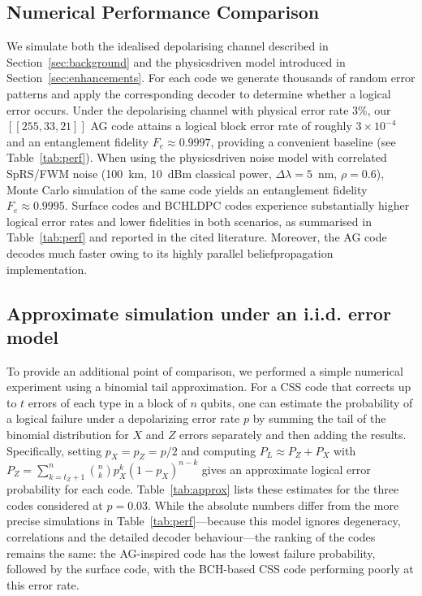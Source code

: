 \documentclass[conference]{IEEEtran}  %
\begin{document}
\subsection{Numerical Performance Comparison}\label{sec:comparison}
We simulate both the idealised depolarising channel described in Section~\ref{sec:background} and the physics\textendash driven model introduced in Section~\ref{sec:enhancements}.  For each code we generate thousands of random error patterns and apply the corresponding decoder to determine whether a logical error occurs.  Under the depolarising channel with physical error rate 3\%, our $[[255,33,21]]$ AG code attains a logical block error rate of roughly $3\times 10^{-4}$ and an entanglement fidelity $F_e\approx 0.9997$, providing a convenient baseline (see Table~\ref{tab:perf}).  When using the physics\textendash driven noise model with correlated SpRS/FWM noise (100~km, 10~dBm classical power, $\Delta\lambda=5$~nm, $\rho=0.6$), Monte Carlo simulation of the same code yields an entanglement fidelity $F_e\approx 0.9995$.  Surface codes and BCH\textendash LDPC codes experience substantially higher logical error rates and lower fidelities in both scenarios, as summarised in Table~\ref{tab:perf} and reported in the cited literature.  Moreover, the AG code decodes much faster owing to its highly parallel belief\textendash propagation implementation.

\subsection*{Approximate simulation under an i.i.d. error model}
To provide an additional point of comparison, we performed a simple numerical experiment using a binomial tail approximation.  For a CSS code that corrects up to $t$ errors of each type in a block of $n$ qubits, one can estimate the probability of a logical failure under a depolarizing error rate $p$ by summing the tail of the binomial distribution for $X$ and $Z$ errors separately and then adding the results.  Specifically, setting $p_X=p_Z=p/2$ and computing $P_L\approx P_Z+P_X$ with $P_Z=\sum_{k=t_Z+1}^n \binom{n}{k}p_X^k(1-p_X)^{n-k}$ gives an approximate logical error probability for each code.  Table~\ref{tab:approx} lists these estimates for the three codes considered at $p=0.03$.  While the absolute numbers differ from the more precise simulations in Table~\ref{tab:perf}—because this model ignores degeneracy, correlations and the detailed decoder behaviour—the ranking of the codes remains the same: the AG-inspired code has the lowest failure probability, followed by the surface code, with the BCH-based CSS code performing poorly at this error rate.
\end{document}
